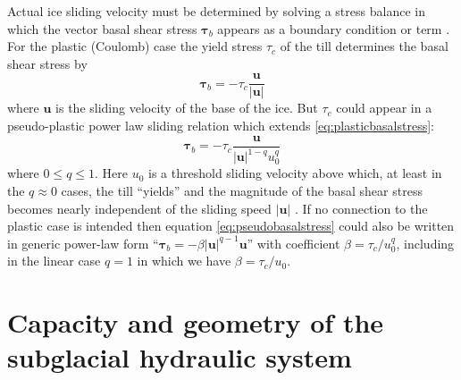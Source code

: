 \documentclass[11pt,final]{amsart}
\begin{document}
Actual ice sliding velocity must be determined by solving a stress balance in which the vector basal shear stress $\mathbold{\tau}_b$ appears as a boundary condition \citep{SchoofCoulombBlatter} or term \citep{BBssasliding}.  For the plastic (Coulomb) case the yield stress $\tau_c$ of the till determines the basal shear stress by
\begin{equation}
\mathbold{\tau}_b = - \tau_c \frac{\mathbold{u}}{|\mathbold{u}|} \label{eq:plasticbasalstress}
\end{equation}
where $\mathbold{u}$ is the sliding velocity of the base of the ice.  But $\tau_c$ could appear in a pseudo-plastic power law sliding relation \citep[see supplement]{AschwandenAdalgeirsdottirKhroulev} which extends \eqref{eq:plasticbasalstress}:
\begin{equation}
\mathbold{\tau}_b = - \tau_c \frac{\mathbold{u}}{|\mathbold{u}|^{1-q} u_0^q} \label{eq:pseudobasalstress}
\end{equation}
where $0\le q \le 1$.  Here $u_0$ is a threshold sliding velocity above which, at least in the $q\approx 0$ cases, the till ``yields'' and the magnitude of the basal shear stress becomes nearly independent of the sliding speed $|\mathbold{u}|$ \citep{BBssasliding}.  If no connection to the plastic case is intended then equation \eqref{eq:pseudobasalstress} could also be written in generic power-law form ``$\mathbold{\tau}_b = - \beta |\mathbold{u}|^{q-1} \mathbold{u}$'' with coefficient $\beta = \tau_c / u_0^q$, including in the linear case $q=1$ in which we have $\beta = \tau_c/u_0$.


\section{Capacity and geometry of the subglacial hydraulic system} \label{sec:capacity}
\end{document}
